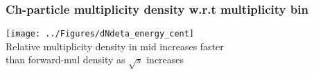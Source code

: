 \begin{frame}
\frametitle{Ch-particle multiplicity density w.r.t multiplicity bin}
\centering
\texttt{[image: ../Figures/dNdeta\_energy\_cent]}\\
Relative multiplicity density in mid increases faster \\than forward-mul density as $\sqrt{s}$ increases

\end{frame}






















